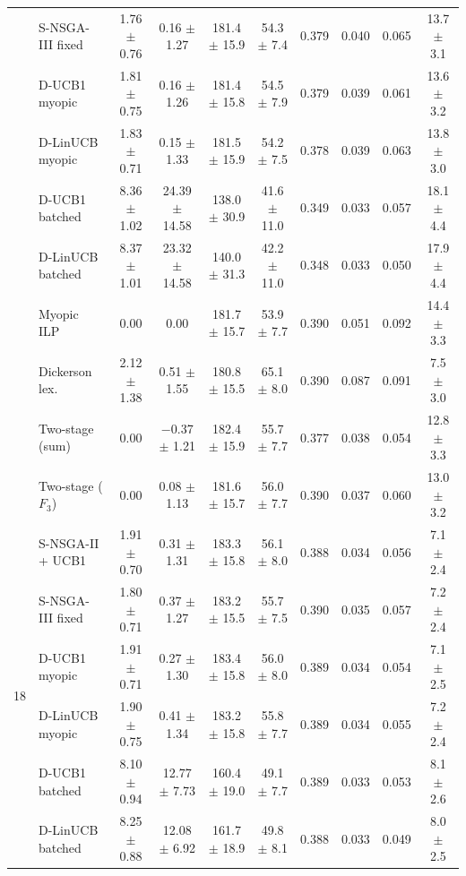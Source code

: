 \begin{table}[!t]
\begin{tabular}{@{}cl cccccccc@{}}
 & S-NSGA-III fixed   & 1.76 $\pm$ 0.76 & 0.16 $\pm$ 1.27   & 181.4 $\pm$ 15.9 & 54.3 $\pm$ 7.4 & 0.379 & 0.040 & 0.065 & 13.7 $\pm$ 3.1 \\
 & D-UCB1 myopic      & 1.81 $\pm$ 0.75 & 0.16 $\pm$ 1.26   & 181.4 $\pm$ 15.8 & 54.5 $\pm$ 7.9 & 0.379 & 0.039 & 0.061 & 13.6 $\pm$ 3.2 \\
 & D-LinUCB myopic    & 1.83 $\pm$ 0.71 & 0.15 $\pm$ 1.33   & 181.5 $\pm$ 15.9 & 54.2 $\pm$ 7.5 & 0.378 & 0.039 & 0.063 & 13.8 $\pm$ 3.0 \\
 & D-UCB1 batched     & 8.36 $\pm$ 1.02 & 24.39 $\pm$ 14.58 & 138.0 $\pm$ 30.9 & 41.6 $\pm$ 11.0 & 0.349 & 0.033 & 0.057 & 18.1 $\pm$ 4.4 \\
 & D-LinUCB batched   & 8.37 $\pm$ 1.01 & 23.32 $\pm$ 14.58 & 140.0 $\pm$ 31.3 & 42.2 $\pm$ 11.0 & 0.348 & 0.033 & 0.050 & 17.9 $\pm$ 4.4 \\
 & Myopic ILP         & 0.00            & 0.00              & 181.7 $\pm$ 15.7 & 53.9 $\pm$ 7.7 & 0.390 & 0.051 & 0.092 & 14.4 $\pm$ 3.3 \\
 & Dickerson lex.     & 2.12 $\pm$ 1.38 & 0.51 $\pm$ 1.55   & 180.8 $\pm$ 15.5 & 65.1 $\pm$ 8.0 & 0.390 & 0.087 & 0.091 & 7.5 $\pm$ 3.0 \\
 & Two-stage (sum)    & 0.00            & $-$0.37 $\pm$ 1.21 & 182.4 $\pm$ 15.9 & 55.7 $\pm$ 7.7 & 0.377 & 0.038 & 0.054 & 12.8 $\pm$ 3.3 \\
 & Two-stage ($F_3$)  & 0.00            & 0.08 $\pm$ 1.13   & 181.6 $\pm$ 15.7 & 56.0 $\pm$ 7.7 & 0.390 & 0.037 & 0.060 & 13.0 $\pm$ 3.2 \\
\midrule
\multirow{10}{*}{18}
 & S-NSGA-II + UCB1   & 1.91 $\pm$ 0.70 & 0.31 $\pm$ 1.31   & 183.3 $\pm$ 15.8 & 56.1 $\pm$ 8.0 & 0.388 & 0.034 & 0.056 & 7.1 $\pm$ 2.4 \\
 & S-NSGA-III fixed   & 1.80 $\pm$ 0.71 & 0.37 $\pm$ 1.27   & 183.2 $\pm$ 15.5 & 55.7 $\pm$ 7.5 & 0.390 & 0.035 & 0.057 & 7.2 $\pm$ 2.4 \\
 & D-UCB1 myopic      & 1.91 $\pm$ 0.71 & 0.27 $\pm$ 1.30   & 183.4 $\pm$ 15.8 & 56.0 $\pm$ 8.0 & 0.389 & 0.034 & 0.054 & 7.1 $\pm$ 2.5 \\
 & D-LinUCB myopic    & 1.90 $\pm$ 0.75 & 0.41 $\pm$ 1.34   & 183.2 $\pm$ 15.8 & 55.8 $\pm$ 7.7 & 0.389 & 0.034 & 0.055 & 7.2 $\pm$ 2.4 \\
 & D-UCB1 batched     & 8.10 $\pm$ 0.94 & 12.77 $\pm$ 7.73  & 160.4 $\pm$ 19.0 & 49.1 $\pm$ 7.7 & 0.389 & 0.033 & 0.053 & 8.1 $\pm$ 2.6 \\
 & D-LinUCB batched   & 8.25 $\pm$ 0.88 & 12.08 $\pm$ 6.92  & 161.7 $\pm$ 18.9 & 49.8 $\pm$ 8.1 & 0.388 & 0.033 & 0.049 & 8.0 $\pm$ 2.5 \\

\end{tabular}
\end{table}

